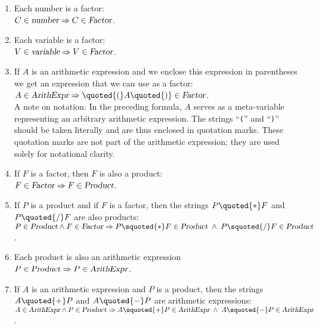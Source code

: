 \begin{enumerate}
\item Each number is a factor:
      \\[0.2cm]
      \hspace*{1.3cm}
      $C \in \textsl{number} \Rightarrow C \in \textsl{Factor}$.
\item Each variable is a factor:
      \\[0.2cm]
      \hspace*{1.3cm}
      $V \in \textsl{variable} \Rightarrow V \in \textsl{Factor}$.
\item If $A$ is an arithmetic expression and we enclose this expression in parentheses
      we get an expression that we can use as a factor:
      \\[0.2cm]
      \hspace*{1.3cm}
      $A \in \textsl{ArithExpr} \Rightarrow \quoted{(}A\quoted{)} \in \textsl{Factor}$. 
      \\[0.2cm]
      A note on notation: In the preceding formula, \( A \) serves as a meta-variable representing an arbitrary
      arithmetic expression. The strings ``\texttt{(}'' and ``\texttt{)}'' should be taken literally and are
      thus enclosed in quotation marks. These quotation marks are not part of the arithmetic expression; they
      are used solely for notational clarity. 
\item If $F$ is a factor, then $F$ is also a product:
      \\[0.2cm]
      \hspace*{1.3cm}
      $F \in \textsl{Factor} \Rightarrow F \in \textsl{Product}$.
\item If $P$ is a product and if $F$ is a factor, then the strings 
      $P \quoted{*} F$ and $P \quoted{/} F$ are also products:
      \\[0.2cm]
      \hspace*{1.3cm}
      $P \in \textsl{Product} \wedge F \in \textsl{Factor} \Rightarrow 
       P \squoted{*} F \in \textsl{Product} \;\wedge\; P \squoted{/} F \in \textsl{Product}$.
\item Each product is also an arithmetic expression
      \\[0.2cm]
      \hspace*{1.3cm}
      $P \in \textsl{Product} \Rightarrow P \in \textsl{ArithExpr}$.
\item If $A$ is an arithmetic expression and $P$ is a product, then
      the strings $A \quoted{+} P$ and $A \quoted{-} P$ are arithmetic expressions:
      \\[0.2cm]
      \hspace*{1.3cm}
      $A \in \textsl{ArithExpr} \wedge P \in \textsl{Product} \Rightarrow
       A \squoted{+} P \in \textsl{ArithExpr} \;\wedge\; A \squoted{-} P \in \textsl{ArithExpr}$.
\end{enumerate}
